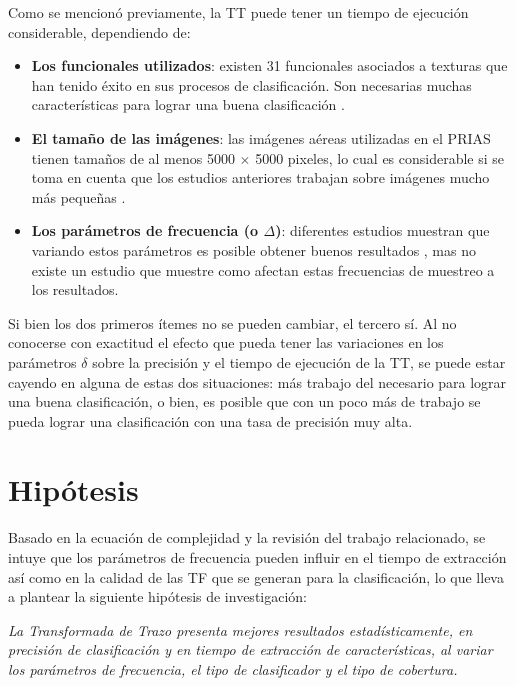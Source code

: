 Como se mencionó previamente, la TT puede tener un tiempo de ejecución considerable, dependiendo de:
\begin{itemize}
    \item \textbf{Los funcionales utilizados}: existen 31 funcionales asociados a texturas \cite{Petrou2007} que han tenido éxito en sus procesos de clasificación. Son necesarias muchas características para lograr una buena clasificación \cite{Petrou2007}.
    \item \textbf{El tamaño de las imágenes}: las imágenes aéreas utilizadas en el PRIAS tienen tamaños de al menos 5000 $\times$ 5000 pixeles, lo cual es considerable si se toma en cuenta que los estudios anteriores trabajan sobre imágenes mucho más pequeñas \cite{Sayeed2001} \cite{Kadyrov2006} \cite{Albukhanajer2013} \cite{Srisuky2003} \cite{Petrou2007}.
    \item \textbf{Los parámetros de frecuencia (o $\Delta$)}: diferentes estudios muestran que variando estos parámetros es posible obtener buenos resultados \cite{Kadyrov2003} \cite{Petrou2007}, mas no existe un estudio que muestre como afectan estas frecuencias de muestreo a los resultados.
\end{itemize}

Si bien los dos primeros ítemes no se pueden cambiar, el tercero sí. Al no conocerse con exactitud el efecto que pueda tener las variaciones en los parámetros $\delta$ sobre la precisión y el tiempo de ejecución de la TT, se puede estar cayendo en alguna de estas dos situaciones: más trabajo del necesario para lograr una buena clasificación, o bien, es posible que con un poco más de trabajo se pueda lograr una clasificación con una tasa de precisión muy alta.

\section{Hipótesis}

Basado en la ecuación de complejidad y la revisión del trabajo relacionado, se intuye que los parámetros de frecuencia pueden influir en el tiempo de extracción así como en la calidad de las TF que se generan para la clasificación, lo que lleva a plantear la siguiente hipótesis de investigación:\\

\begin{large}
\textit{La Transformada de Trazo presenta mejores resultados estadísticamente, en precisión de clasificación y en tiempo de extracción de características, al variar los parámetros de frecuencia, el tipo de clasificador y el tipo de cobertura.}
\end{large}

